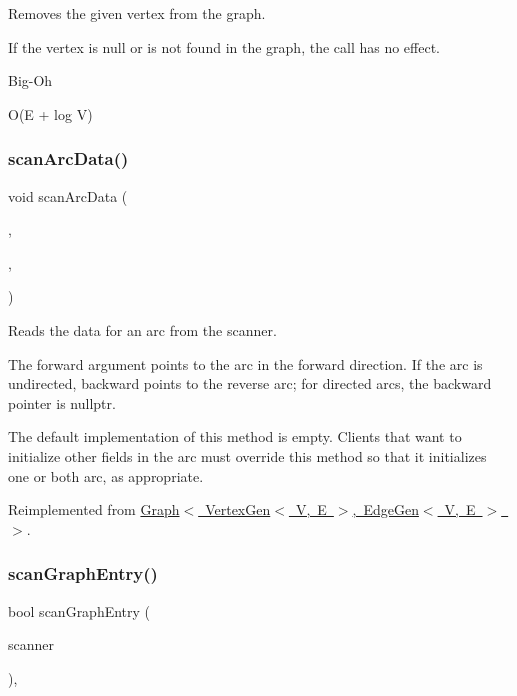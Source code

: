 Removes the given vertex from the graph. 

If the vertex is null or is not found in the graph, the call has no effect. \begin{DoxyRefDesc}{Big-\/\+Oh}
\item[\mbox{\hyperlink{BigOh__BigOh000033}{Big-\/\+Oh}}]O(E + log V) \end{DoxyRefDesc}
\mbox{\label{classBasicGraphGen_a4314b3b6bda0755a87e49070edd17c3d}} 
\subsubsection{\texorpdfstring{scan\+Arc\+Data()}{scanArcData()}}
{\footnotesize\ttfamily void scan\+Arc\+Data (\begin{DoxyParamCaption}\item[{\mbox{\hyperlink{classTokenScanner}{Token\+Scanner}} \&}]{,  }\item[{Edge\+Gen$<$ V, E $>$ $\ast$}]{,  }\item[{Edge\+Gen$<$ V, E $>$ $\ast$}]{ }\end{DoxyParamCaption})\hspace{0.3cm}{\ttfamily [virtual]}}



Reads the data for an arc from the scanner. 

The {\ttfamily forward} argument points to the arc in the forward direction. If the arc is undirected, {\ttfamily backward} points to the reverse arc; for directed arcs, the {\ttfamily backward} pointer is {\ttfamily nullptr}.

The default implementation of this method is empty. Clients that want to initialize other fields in the arc must override this method so that it initializes one or both arc, as appropriate. 

Reimplemented from \mbox{\hyperlink{classGraph_ac73c985ef66569e5f6df9c315cab466b}{Graph$<$ Vertex\+Gen$<$ V, E $>$, Edge\+Gen$<$ V, E $>$ $>$}}.

\mbox{\label{classGraph_a1c4e1a05a40013ce4e4bb539d05b9937}} 
\subsubsection{\texorpdfstring{scan\+Graph\+Entry()}{scanGraphEntry()}}
{\footnotesize\ttfamily bool scan\+Graph\+Entry (\begin{DoxyParamCaption}\item[{\mbox{\hyperlink{classTokenScanner}{Token\+Scanner}} \&}]{scanner }\end{DoxyParamCaption})\hspace{0.3cm}{\ttfamily [virtual]}, {\ttfamily [inherited]}}



